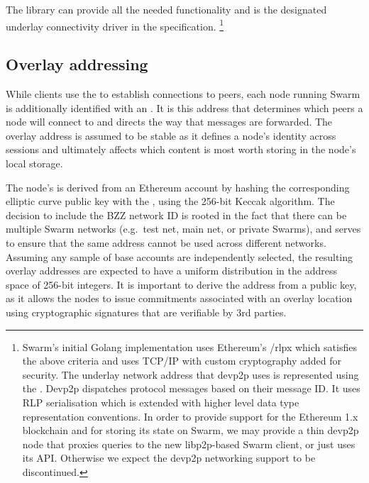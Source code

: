 The  library can provide all the needed functionality and is the designated underlay connectivity driver in the specification.%
%
\footnote{Swarm's initial Golang implementation uses Ethereum's /rlpx which satisfies the above criteria and uses TCP/IP with custom cryptography added for security. The underlay network address that devp2p uses is represented using the . Devp2p dispatches protocol messages based on their message ID. It uses RLP serialisation which is extended with higher level data type representation conventions. In order to provide support for the Ethereum 1.x blockchain and for storing its state on Swarm, we may provide a thin devp2p node that proxies queries to the new libp2p-based Swarm client, or just uses its API. Otherwise we expect the devp2p networking support to be discontinued.}

\subsection{Overlay addressing\statusgreen}\label{sec:overlay-addressing} 
\green{}

While clients use the  to establish connections to peers, each node running Swarm is additionally identified with an . It is this address that determines which peers a node will connect to and directs the way that messages are forwarded. The overlay address is assumed to be stable as it defines a node's identity across sessions and ultimately affects which content is most worth storing in the node's local storage.

The node's  is derived from an Ethereum account by hashing the corresponding elliptic curve public key with the , using the 256-bit Keccak algorithm. The decision to include the BZZ network ID is rooted in the fact that there can be multiple Swarm networks (e.g.\ test net, main net, or private Swarms), and serves to ensure that the same address cannot be used across different networks. Assuming any sample of base accounts are independently selected, the resulting overlay addresses are expected to have a uniform distribution in the address space of 256-bit integers. It is important to derive the address from a public key, as it allows the nodes to issue commitments associated with an overlay location using cryptographic signatures that are verifiable by 3rd parties. 

